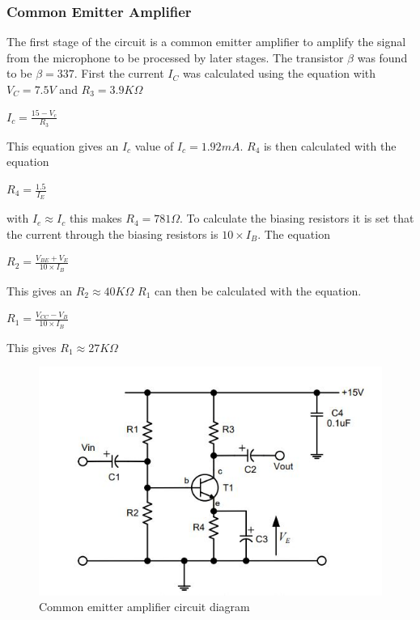 \documentclass[10pt,a4paper]{article}
\begin{document}
\subsubsection{Common Emitter Amplifier}
The first stage of the circuit is a common emitter amplifier to amplify the signal from the microphone to be processed by later stages. The transistor $\beta$ was found to be $\beta = 337$. First the current $I_C$ was calculated using the equation with $V_C = 7.5V$ and $ R_3 = 3.9K\Omega$ \newline
\begin{center}
\Huge
$I_c = \frac{15-V_c}{R_3}$
\end{center}
This equation gives an $I_c$ value of $ I_c = 1.92mA$. $R_4$ is then calculated with the equation
\begin{center}
\Huge
$R_4 = \frac{1.5}{I_E}$
\end{center}
with $I_e \approx I_c$ this makes $R_4= 781 \Omega$. To calculate the biasing resistors it is set that the current through the biasing resistors is $10\times I_B$. The equation 
\begin{center}
\Huge
$R_2 = \frac{V_{BE} + V_E}{10\times I_B}$
\end{center}
This gives an $R_2 \approx 40K\Omega$
$R_1$ can then be calculated with the equation.
\begin{center}
\Huge
$R_1 = \frac{V_{CC}-V_B}{10\times I_B}$
\end{center} 
This gives $R_1 \approx 27K\Omega$
\begin{figure}[!h]
\includegraphics[scale=1]{CircuitDiagram}
\caption{Common emitter amplifier circuit diagram}
\end{figure}
\end{document}
